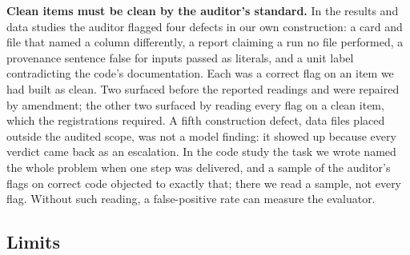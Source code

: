 \textbf{Clean items must be clean by the auditor's standard.} In the results and data studies the
auditor flagged four defects in our own construction: a card and file that named a column
differently, a report claiming a run no file performed, a provenance sentence false for inputs passed
as literals, and a unit label contradicting the code's documentation. Each was a correct flag on an
item we had built as clean. Two surfaced before the reported readings and were repaired by amendment;
the other two surfaced by reading every flag on a clean item, which the registrations required. A
fifth construction defect, data files placed outside the audited scope, was not a model finding: it
showed up because every verdict came back as an escalation. In the code study the task we wrote named the whole problem when one step was delivered,
and a sample of the auditor's flags on correct code objected to exactly that; there we read a sample,
not every flag. Without such reading, a false-positive rate can measure the evaluator.

\subsection{Limits}
\label{sec:limits}

